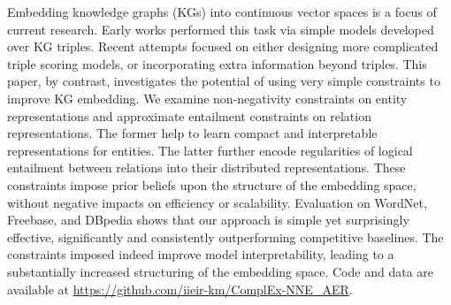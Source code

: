 Embedding knowledge graphs (KGs) into continuous vector spaces is a focus of current research. Early works performed this task via simple models developed over KG triples. Recent attempts focused on either designing more complicated triple scoring models, or incorporating extra information beyond triples. This paper, by contrast, investigates the potential of using very simple constraints to improve KG embedding. We examine non-negativity constraints on entity representations and approximate entailment constraints on relation representations. The former help to learn compact and interpretable representations for entities. The latter further encode regularities of logical entailment between relations into their distributed representations. These constraints impose prior beliefs upon the structure of the embedding space, without negative impacts on efficiency or scalability. Evaluation on WordNet, Freebase, and DBpedia shows that our approach is simple yet surprisingly effective, significantly and consistently outperforming competitive baselines. The constraints imposed indeed improve model interpretability, leading to a substantially increased structuring of the embedding space. Code and data are available at \url{https://github.com/iieir-km/ComplEx-NNE\_AER}.

